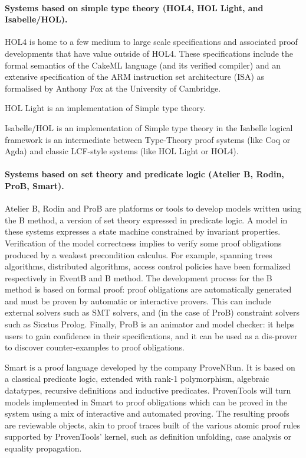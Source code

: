 \paragraph*{Systems based on simple type theory (HOL4, HOL Light, and Isabelle/HOL).}

HOL4 is home to a few medium to large scale specifications and
associated proof developments that have value outside of HOL4. These
specifications include the formal semantics of the CakeML language
(and its verified compiler) and an extensive specification of the ARM
instruction set architecture (ISA) as formalised by Anthony Fox at the
University of Cambridge.

HOL Light is an implementation of Simple type theory.

Isabelle/HOL is an implementation of Simple type theory in the
Isabelle logical framework \cite{paulson700} is an intermediate
between Type-Theory proof systems (like Coq or Agda) and classic
LCF-style systems (like HOL Light or HOL4).

  \paragraph*{Systems based on set theory and predicate logic (Atelier B,  Rodin, ProB, Smart).}

Atelier B, Rodin and ProB are platforms or tools to develop models written
using the B method, a version of set theory expressed in predicate
logic.  A model in these systems expresses a state machine constrained
by invariant properties. Verification of the model correctness implies
to verify some proof obligations produced by a weakest precondition
calculus. For example, spanning trees algorithms, distributed
algorithms, access control policies have been formalized
respectively in EventB and B method.  The development process for
the B method is based on formal proof: proof obligations are
automatically generated and must be proven by automatic or interactive
provers. This can include external solvers such as SMT solvers, and
(in the case of ProB) constraint solvers such as Sicstus
Prolog. Finally, ProB is an animator and model checker: it helps users
to gain confidence in their specifications, and it can be used as a
dis-prover to discover counter-examples to proof obligations.
  
Smart is a proof language developed by the company ProveNRun. It is
based on a classical predicate logic, extended with rank-1
polymorphism, algebraic datatypes, recursive definitions and inductive
predicates. ProvenTools will turn models implemented in Smart to proof
obligations which can be proved in the system using a mix of
interactive and automated proving. The resulting proofs are reviewable
objects, akin to proof traces built of the various atomic proof rules
supported by ProvenTools' kernel, such as definition unfolding, case
analysis or equality propagation.

